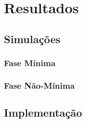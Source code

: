 %

\chapter{Resultados} \label{capRes}
\section{Simulações} \label{secAnalise}
\subsection{Fase Mínima}

\subsection{Fase Não-Mínima}
\section{Implementação}

%

